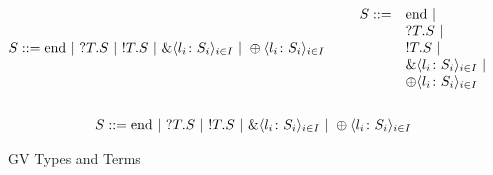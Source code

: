 \begin{figure*}
\begin{gather*}
  S \bnf \mbox{\lstinline{end}} \alt \inpt{T}{S} \alt \outpt{T}{S} \alt
  \Branch{l_i}{S_i}{i\in I} \alt \Choice{l_i}{S_i}{i\in I}
  \qquad
  \begin{array}{ll}
    S \bnf & \mbox{\lstinline{end}} \alt \\
           & \inpt{T}{S} \alt \\
           & \outpt{T}{S} \alt \\
           & \Branch{l_i}{S_i}{i\in I} \alt \\
           & \Choice{l_i}{S_i}{i\in I}
  \end{array}
  \\ \\
  S \bnf \mbox{\lstinline{end}} \alt \inpt{T}{S} \alt \outpt{T}{S} \alt
  \Branch{l_i}{S_i}{i\in I} \alt \Choice{l_i}{S_i}{i\in I}  
\end{gather*}
\caption{GV Types and Terms}
\label{fig:gvtnts}
\end{figure*}
